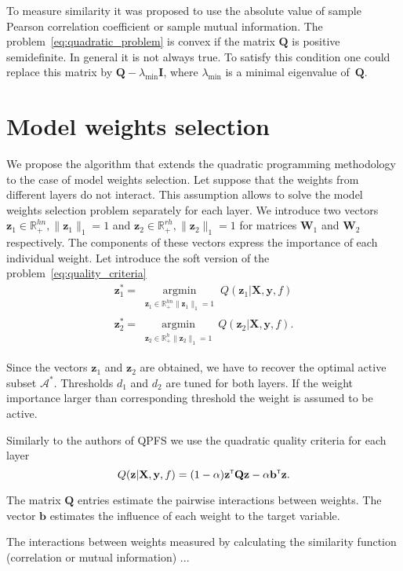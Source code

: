 \documentclass[a4paper,12pt]{article}
\theoremstyle{plain} %
\theoremstyle{definition} %
\theoremstyle{remark} %
\newcommand{\bb}{\mathbf{b}}
\newcommand{\bQ}{\mathbf{Q}}
\newcommand{\bW}{\mathbf{W}}
\newcommand{\by}{\mathbf{y}}
\newcommand{\bz}{\mathbf{z}}
\newcommand{\bX}{\mathbf{X}}
\newcommand{\cA}{\mathcal{A}}
\newcommand{\bbR}{\mathbb{R}}
\newcommand{\T}{{\text{\tiny\sffamily\upshape\mdseries T}}}
\newcommand{\argmin}{\mathop{\arg \min}\limits}
\begin{document}
  	To measure similarity it was proposed to use the absolute value of sample Pearson correlation coefficient or sample mutual information.
  	The problem~\ref{eq:quadratic_problem} is convex if the matrix $\bQ$ is positive semidefinite. In general it is not always true. To satisfy this condition one could replace this matrix by $\bQ - \lambda_{\text{min}} \mathbf{I}$, where $\lambda_{\text{min}} $ is a minimal eigenvalue of~$\bQ$.
  	  	
  	\section*{Model weights selection}
  	
	We propose the algorithm that extends the quadratic programming methodology to the case of model weights selection.
	Let suppose that the weights from different layers do not interact. 
	This assumption allows to solve the model weights selection problem separately for each layer.
	We introduce two vectors $\bz_1 \in \bbR^{hn}_{+}, \|\bz_1\|_1 = 1$ and $\bz_2 \in \bbR^{rh}_{+}, \|\bz_2\|_1 = 1$ for matrices $\bW_1$ and $\bW_2$ respectively. 
	The components of these vectors express the importance of each individual weight.
	Let introduce the soft version of the problem~\ref{eq:quality_criteria}
	\begin{align*}
		\bz_1^* = \argmin_{\substack{\bz_1 \in \bbR^{hn}_{+} \| \bz_1 \|_1 = 1}} Q(\bz_1 | \bX, \by, f) \\
		\bz_2^* = \argmin_{\substack{ \bz_2 \in \bbR^{h}_{+} \| \bz_2 \|_1 = 1}} Q(\bz_2 | \bX, \by, f) .
		\label{eq:soft_quality_criteria}
	\end{align*}

	Since the vectors $\bz_1$ and $\bz_2$ are obtained, we have to recover the optimal active subset $\cA^*$. 
	Thresholds $d_1$ and $d_2$ are tuned for both layers. If the weight importance larger than corresponding threshold the weight is assumed to be active.
	
	Similarly to the authors of QPFS we use the quadratic quality criteria for each layer
	\begin{equation}
		Q(\bz | \bX, \by, f) = (1 - \alpha) \bz^{\T} \bQ\bz - \alpha \mathbf{b}^{\T} \bz.
	\end{equation}
	
	The matrix $\bQ$ entries estimate the pairwise interactions between weights. The vector $\bb$ estimates the influence of each weight to the target variable.
	
	The interactions between weights measured by calculating the similarity function (correlation or mutual information) ...
	
\end{document}
